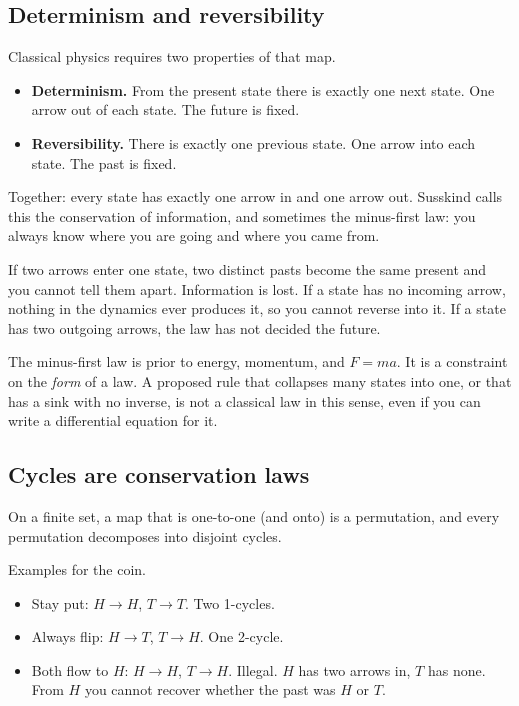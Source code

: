 \documentclass[11pt]{article}
\numberwithin{equation}{section}
\begin{document}
\subsection{Determinism and reversibility}

Classical physics requires two properties of that map.

\begin{itemize}[leftmargin=1.4em]
\item \textbf{Determinism.} From the present state there is exactly one next state. One arrow out of each state. The future is fixed.
\item \textbf{Reversibility.} There is exactly one previous state. One arrow into each state. The past is fixed.
\end{itemize}

Together: every state has exactly one arrow in and one arrow out. Susskind calls this the conservation of information, and sometimes the minus-first law: you always know where you are going and where you came from.

If two arrows enter one state, two distinct pasts become the same present and you cannot tell them apart. Information is lost. If a state has no incoming arrow, nothing in the dynamics ever produces it, so you cannot reverse into it. If a state has two outgoing arrows, the law has not decided the future.

The minus-first law is prior to energy, momentum, and $F=ma$. It is a constraint on the \emph{form} of a law. A proposed rule that collapses many states into one, or that has a sink with no inverse, is not a classical law in this sense, even if you can write a differential equation for it.

\subsection{Cycles are conservation laws}

On a finite set, a map that is one-to-one (and onto) is a permutation, and every permutation decomposes into disjoint cycles.

Examples for the coin.
\begin{itemize}[leftmargin=1.4em]
\item Stay put: $H\to H$, $T\to T$. Two 1-cycles.
\item Always flip: $H\to T$, $T\to H$. One 2-cycle.
\item Both flow to $H$: $H\to H$, $T\to H$. Illegal. $H$ has two arrows in, $T$ has none. From $H$ you cannot recover whether the past was $H$ or $T$.
\end{itemize}
\end{document}
